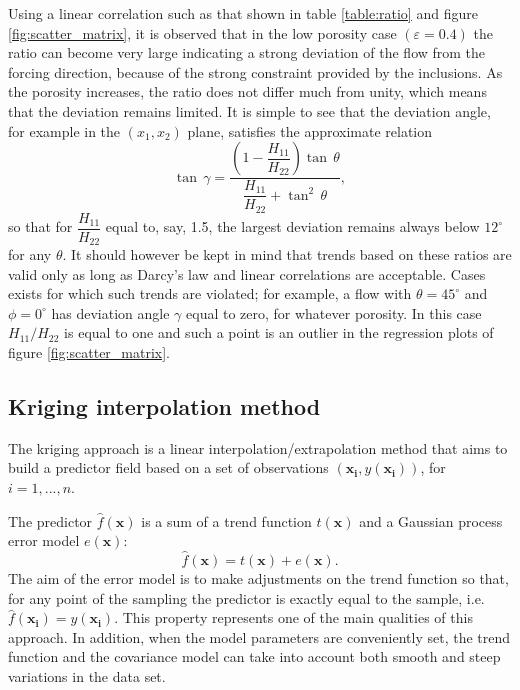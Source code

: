 Using a linear correlation such as that shown in table \ref{table:ratio} and  figure \ref{fig:scatter_matrix}, it is 
observed that in the low porosity case $(\varepsilon=0.4)$ the ratio can become very large indicating a strong deviation of the flow from the forcing direction, because of the strong constraint provided by the inclusions. As the porosity increases, the ratio does not differ much from unity, which means that the deviation remains limited. It is simple to see that
the deviation angle, for example in the $(x_1, x_2)$ plane, satisfies the approximate relation
$$
\tan \, \gamma = \dfrac{\left(1 - \dfrac{H_{11}}{H_{22}}\right) \tan \, \theta}{\dfrac{H_{11}}{H_{22}} + \tan^2 \, \theta},
$$
so that for $\dfrac{H_{11}}{H_{22}}$ equal to, say, 1.5, the largest deviation remains always below $12^{\circ}$ for any $\theta$.
It should however be kept in mind that trends based on these ratios are valid only as long as Darcy's law and linear correlations
are acceptable. Cases exists for which such trends are violated; for example, a flow with $\theta = 45^{\circ}$ and $\phi = 0^{\circ}$ has
deviation angle $\gamma$ equal to zero, for whatever porosity. In this case $H_{11}/H_{22}$ is equal to one and such a point is an 
outlier in the regression plots of figure \ref{fig:scatter_matrix}.


\subsection{Kriging interpolation method}

The kriging approach is a linear interpolation/extrapolation method that aims to build a predictor field
based on a set of observations  $(\mathbf{x_i}, y(\mathbf{x_i}))$,  for $i=1,...,n$. 

The predictor $\hat{f}(\mathbf{x})$ is a sum of a trend function $t(\mathbf{x})$ and a Gaussian process error model $e(\mathbf{x})$:
\begin{equation}
\hat{f}(\mathbf{x}) = t(\mathbf{x}) + e(\mathbf{x}).
\label{eq:Kriging}
\end{equation}
The aim of the error model is to make adjustments on the trend function so that,
for any point of the sampling
the predictor is  exactly equal to the sample, 
i.e. $\hat{f}(\mathbf{x_i}) = y(\mathbf{x_i})$. This property represents one of the main qualities of this approach. In addition, 
when  the model parameters are  conveniently  set,  the trend function and the covariance model can take into account both smooth and steep variations in the data set.


